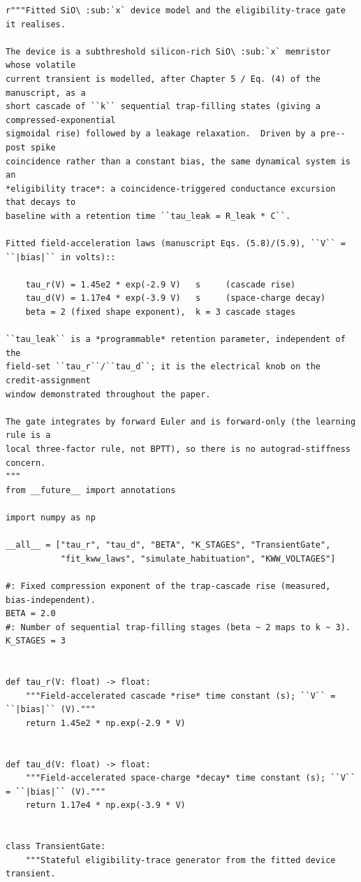 \begin{lstlisting}[caption={mrl\_trace/device.py},label={lst:siox-src-device}]
r"""Fitted SiO\ :sub:`x` device model and the eligibility-trace gate it realises.

The device is a subthreshold silicon-rich SiO\ :sub:`x` memristor whose volatile
current transient is modelled, after Chapter 5 / Eq. (4) of the manuscript, as a
short cascade of ``k`` sequential trap-filling states (giving a compressed-exponential
sigmoidal rise) followed by a leakage relaxation.  Driven by a pre--post spike
coincidence rather than a constant bias, the same dynamical system is an
*eligibility trace*: a coincidence-triggered conductance excursion that decays to
baseline with a retention time ``tau_leak = R_leak * C``.

Fitted field-acceleration laws (manuscript Eqs. (5.8)/(5.9), ``V`` = ``|bias|`` in volts)::

    tau_r(V) = 1.45e2 * exp(-2.9 V)   s     (cascade rise)
    tau_d(V) = 1.17e4 * exp(-3.9 V)   s     (space-charge decay)
    beta = 2 (fixed shape exponent),  k = 3 cascade stages

``tau_leak`` is a *programmable* retention parameter, independent of the
field-set ``tau_r``/``tau_d``; it is the electrical knob on the credit-assignment
window demonstrated throughout the paper.

The gate integrates by forward Euler and is forward-only (the learning rule is a
local three-factor rule, not BPTT), so there is no autograd-stiffness concern.
"""
from __future__ import annotations

import numpy as np

__all__ = ["tau_r", "tau_d", "BETA", "K_STAGES", "TransientGate",
           "fit_kww_laws", "simulate_habituation", "KWW_VOLTAGES"]

#: Fixed compression exponent of the trap-cascade rise (measured, bias-independent).
BETA = 2.0
#: Number of sequential trap-filling stages (beta ~ 2 maps to k ~ 3).
K_STAGES = 3


def tau_r(V: float) -> float:
    """Field-accelerated cascade *rise* time constant (s); ``V`` = ``|bias|`` (V)."""
    return 1.45e2 * np.exp(-2.9 * V)


def tau_d(V: float) -> float:
    """Field-accelerated space-charge *decay* time constant (s); ``V`` = ``|bias|`` (V)."""
    return 1.17e4 * np.exp(-3.9 * V)


class TransientGate:
    """Stateful eligibility-trace generator from the fitted device transient.


\end{lstlisting}
